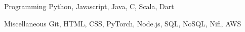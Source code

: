 

\begin{cvskills}

  \cvskill
    {Programming} %
    {Python, Javascript, Java, C, Scala, Dart} %

  \cvskill
    {Miscellaneous} %
    {Git, HTML, CSS, PyTorch, Node.js, SQL, NoSQL, Nifi, AWS} %
\end{cvskills}
